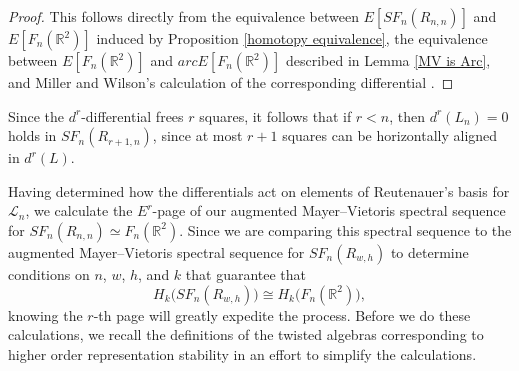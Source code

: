 \documentclass[pagebackref,colorlinks,citecolor=blue,linkcolor=blue,urlcolor=blue,filecolor=blue]{article}
\theoremstyle{definition}\newtheorem{definition}[thm]{Definition}
\theoremstyle{definition}
\newcommand{\R}{\ensuremath{\mathbb{R}}}
\begin{document}
\begin{proof}
This follows directly from the equivalence between $E[SF_{n}(R_{n, n})]$ and $E[F_{n}(\R^{2})]$ induced by Proposition \ref{homotopy equivalence}, the equivalence between $E[F_{n}(\R^{2})]$ and $arcE[F_{n}(\R^{2})]$ described in Lemma \ref{MV is Arc}, and Miller and Wilson's calculation of the corresponding differential \cite[Lemma 3.17]{miller2019higher}.
\end{proof}

Since the $d^{r}$-differential frees $r$ squares, it follows that if $r<n$, then $d^{r}(L_{n})=0$ holds in $SF_{n}(R_{r+1,n})$, since at most $r+1$ squares can be horizontally aligned in $d^{r}(L)$.

Having determined how the differentials act on elements of Reutenauer's basis for $\mathcal{L}_{n}$, we calculate the $E^{r}$-page of our augmented Mayer--Vietoris spectral sequence for $SF_{n}(R_{n,n})\simeq F_{n}(\R^{2})$.
Since we are comparing this spectral sequence to the augmented Mayer--Vietoris spectral sequence for $SF_{n}(R_{w,h})$ to determine conditions on $n$, $w$, $h$, and $k$ that guarantee that 
\[
H_{k}\big(SF_{n}(R_{w,h})\big)\cong H_{k}\big(F_{n}(\R^{2})\big),
\]
knowing the $r$-th page will greatly expedite the process.
Before we do these calculations, we recall the definitions of the twisted algebras corresponding to higher order representation stability in an effort to simplify the calculations.
\end{document}
